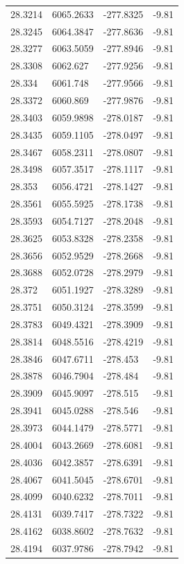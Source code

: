 \begin{table}[H]
\begin{tabular}{llll}
28.3214 & 6065.2633 & -277.8325 & -9.81 \\
28.3245 & 6064.3847 & -277.8636 & -9.81 \\
28.3277 & 6063.5059 & -277.8946 & -9.81 \\
28.3308 & 6062.627 & -277.9256 & -9.81 \\
28.334 & 6061.748 & -277.9566 & -9.81 \\
28.3372 & 6060.869 & -277.9876 & -9.81 \\
28.3403 & 6059.9898 & -278.0187 & -9.81 \\
28.3435 & 6059.1105 & -278.0497 & -9.81 \\
28.3467 & 6058.2311 & -278.0807 & -9.81 \\
28.3498 & 6057.3517 & -278.1117 & -9.81 \\
28.353 & 6056.4721 & -278.1427 & -9.81 \\
28.3561 & 6055.5925 & -278.1738 & -9.81 \\
28.3593 & 6054.7127 & -278.2048 & -9.81 \\
28.3625 & 6053.8328 & -278.2358 & -9.81 \\
28.3656 & 6052.9529 & -278.2668 & -9.81 \\
28.3688 & 6052.0728 & -278.2979 & -9.81 \\
28.372 & 6051.1927 & -278.3289 & -9.81 \\
28.3751 & 6050.3124 & -278.3599 & -9.81 \\
28.3783 & 6049.4321 & -278.3909 & -9.81 \\
28.3814 & 6048.5516 & -278.4219 & -9.81 \\
28.3846 & 6047.6711 & -278.453 & -9.81 \\
28.3878 & 6046.7904 & -278.484 & -9.81 \\
28.3909 & 6045.9097 & -278.515 & -9.81 \\
28.3941 & 6045.0288 & -278.546 & -9.81 \\
28.3973 & 6044.1479 & -278.5771 & -9.81 \\
28.4004 & 6043.2669 & -278.6081 & -9.81 \\
28.4036 & 6042.3857 & -278.6391 & -9.81 \\
28.4067 & 6041.5045 & -278.6701 & -9.81 \\
28.4099 & 6040.6232 & -278.7011 & -9.81 \\
28.4131 & 6039.7417 & -278.7322 & -9.81 \\
28.4162 & 6038.8602 & -278.7632 & -9.81 \\
28.4194 & 6037.9786 & -278.7942 & -9.81 \\

\end{tabular}
\end{table}
